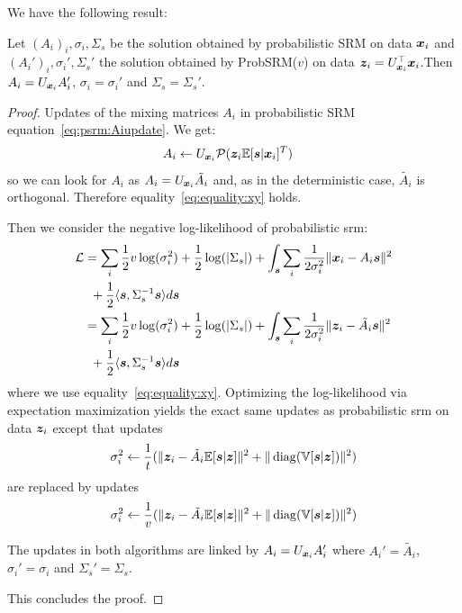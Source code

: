 We have the following result:
\begin{prop}
  Let $(A_i)_i, \sigma_i, \Sigma_s$ be the solution obtained by probabilistic SRM on data
  $\boldsymbol{x}_i$ and $(A_i')_i, \sigma_i', \Sigma_s'$ the solution obtained by ProbSRM($v$) on
  data $\boldsymbol{z}_i = U_{\boldsymbol{x}_i}^{\top} \boldsymbol{x}_i$.Then $A_i = U_{\boldsymbol{x}_i}A_i'$, $\sigma_i =
  \sigma_i'$ and $\Sigma_s = \Sigma_s'$. 
  \label{prop:optimalprobsrm}
\end{prop}
\begin{proof}
  Updates of the mixing matrices $A_i$ in probabilistic SRM equation~\eqref{eq:psrm:Aiupdate}. We get:
  \begin{align}
    A_i &\leftarrow U_{\boldsymbol{x}_i}\mathcal{P}(\boldsymbol{z}_i \mathbb{E}[\boldsymbol{s}| \boldsymbol{x}_i]^T)
    \label{eq:fastprobsrm:Aiupdate}
  \end{align}
  so we can look for $A_i$ as $A_i = U_{\boldsymbol{x}_i} \tilde{A_i}$ and, as in the
  deterministic case, $\tilde{A_i}$ is orthogonal.
  Therefore equality~\eqref{eq:equality:xy} holds.
  
  Then we consider the negative log-likelihood of probabilistic srm:
  \begin{align}
    \mathcal{L} &= \sum_i \frac12 v\log(\sigma_i^2) + \frac12 \log(|\Sigma_s|) + \int_{\boldsymbol{s}} \sum_i \frac1{2 \sigma_i^{2}}\|\boldsymbol{x}_i - A_i \boldsymbol{s} \|^2 \\& \enspace + \frac12 \langle{ \boldsymbol{s}},{ \Sigma_s^{-1} \boldsymbol{s} }\rangle  d\boldsymbol{s} \\
          &= \sum_i \frac12 v \log(\sigma_i^2) + \frac12 \log(|\Sigma_s|) + \int_{\boldsymbol{s}} \sum_i \frac1{2 \sigma_i^{2}}\|\boldsymbol{z}_i - \tilde{A_i} \boldsymbol{s} \|^2 \\& \enspace+ \frac12 \langle{ \boldsymbol{s}},{ \Sigma_s^{-1} \boldsymbol{s} }\rangle  d\boldsymbol{s}
  \end{align}
  where we use equality~\eqref{eq:equality:xy}.
  Optimizing the log-likelihood via expectation maximization yields the exact
  same updates as probabilistic srm on data $\boldsymbol{z}_i$
  except that updates
  \begin{align}
    \sigma_i^2 \leftarrow \frac1{t} (\| \boldsymbol{z}_i - \tilde{A_i} \mathbb{E}[\boldsymbol{s}|\boldsymbol{z}]\|^2 + \| \operatorname*{diag}(\mathbb{V}[\boldsymbol{s} | \boldsymbol{z}]) \|^2)
  \end{align}
  are replaced by updates
  \begin{align}
    \sigma_i^2 \leftarrow \frac1{v} (\| \boldsymbol{z}_i - \tilde{A_i} \mathbb{E}[\boldsymbol{s}|\boldsymbol{z}]\|^2 + \| \operatorname*{diag}(\mathbb{V}[\boldsymbol{s} | \boldsymbol{z}]) \|^2)
  \end{align}

  The updates in both algorithms are linked  by $A_i = U_{\boldsymbol{x}_i}A_i'$ where
  $A_i' = \tilde{A_i}$, $\sigma_i' =
  \sigma_i$ and $\Sigma_s'  = \Sigma_s$.

  This concludes the proof.
\end{proof}

